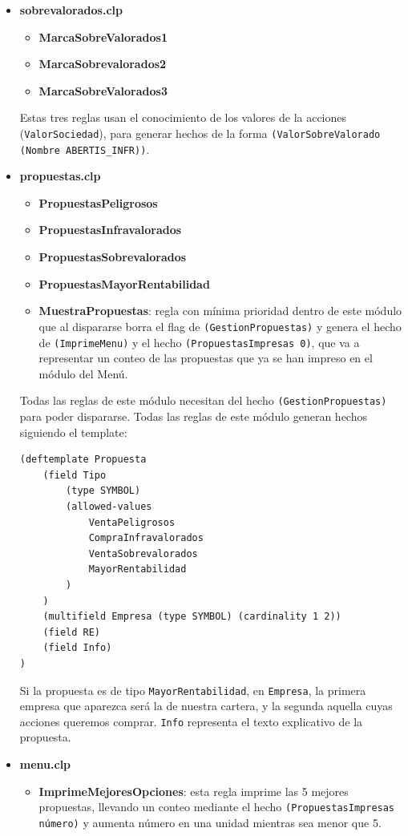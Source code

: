 \documentclass[a4paper,11pt]{article}
\begin{document}
\begin{itemize}
\item \textbf{sobrevalorados.clp}
\begin{itemize}
  \item \textbf{MarcaSobreValorados1}
  \item \textbf{MarcaSobrevalorados2}
  \item \textbf{MarcaSobreValorados3}
\end{itemize}

  Estas tres reglas usan el conocimiento de los valores de la acciones (\texttt{ValorSociedad}), para generar hechos de
  la forma \texttt{(ValorSobreValorado (Nombre ABERTIS\_INFR))}.

  
\item \textbf{propuestas.clp}
\begin{itemize}
  \item \textbf{PropuestasPeligrosos}
  \item \textbf{PropuestasInfravalorados}
  \item \textbf{PropuestasSobrevalorados}
  \item \textbf{PropuestasMayorRentabilidad}
  \item \textbf{MuestraPropuestas}: regla con mínima prioridad dentro de este módulo que al dispararse borra el flag de
    \texttt{(GestionPropuestas)} y genera el hecho de \texttt{(ImprimeMenu)} y el hecho \texttt{(PropuestasImpresas 0)}, que
    va a representar un conteo de las propuestas que ya se han impreso en el módulo del Menú.
\end{itemize}

Todas las reglas de este módulo necesitan del hecho \texttt{(GestionPropuestas)} para poder dispararse. Todas las reglas de
este módulo generan hechos siguiendo el template:

\begin{verbatim}
(deftemplate Propuesta
    (field Tipo
        (type SYMBOL)
        (allowed-values
            VentaPeligrosos
            CompraInfravalorados
            VentaSobrevalorados
            MayorRentabilidad
        )
    )
    (multifield Empresa (type SYMBOL) (cardinality 1 2))
    (field RE)
    (field Info)
)
\end{verbatim}

Si la propuesta es de tipo \texttt{MayorRentabilidad}, en \texttt{Empresa}, la primera empresa que aparezca será la de nuestra
cartera, y la segunda aquella cuyas acciones queremos comprar. \texttt{Info} representa el texto explicativo de la propuesta.


\item \textbf{menu.clp}
\begin{itemize}
\item \textbf{ImprimeMejoresOpciones}: esta regla imprime las 5 mejores propuestas, llevando un conteo mediante el hecho
\texttt{(PropuestasImpresas número)} y aumenta número en una unidad mientras sea menor que 5.


\end{itemize}
\end{itemize}
\end{document}
